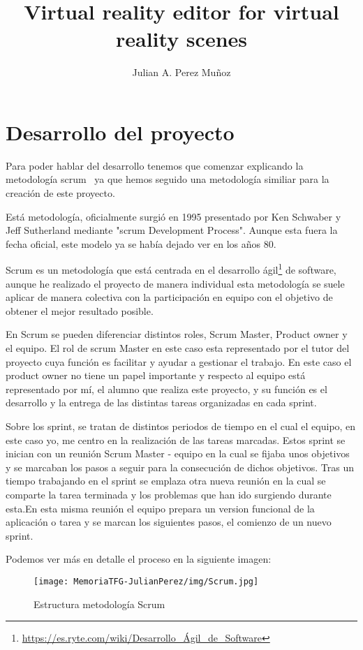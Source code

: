 \documentclass[a4paper, 12pt]{book}
\title{Virtual reality editor for virtual reality scenes}
\author{Julian A. Perez Muñoz}
\begin{document}
\cleardoublepage
\chapter{Desarrollo del proyecto}
\label{chap:Desarrollo del proyecto}
Para poder hablar del desarrollo tenemos que comenzar explicando la metodología scrum~\cite{proyectos} ya que hemos seguido una metodología similiar para la creación de este proyecto.

Está metodología, oficialmente surgió en 1995 presentado por Ken Schwaber y Jeff Sutherland mediante "scrum Development Process". Aunque esta fuera la fecha oficial, este modelo ya se había dejado ver en los años 80.

Scrum es un metodología que está centrada en el desarrollo ágil\footnote{\url{https://es.ryte.com/wiki/Desarrollo_Ágil_de_Software}}  de software, aunque he realizado el proyecto de manera individual esta metodología se suele aplicar de manera colectiva con la participación en equipo con el objetivo de obtener el mejor resultado posible.

En Scrum se pueden diferenciar distintos roles, Scrum Master, Product owner y el equipo. El rol de scrum Master en este caso esta representado por el tutor del proyecto cuya función es facilitar y ayudar a gestionar el trabajo. En este caso el product owner no tiene un papel importante y respecto al equipo está representado por mí, el alumno que realiza este proyecto, y su función es el desarrollo y la entrega de las distintas tareas organizadas en cada sprint.

Sobre los sprint, se tratan de distintos periodos de tiempo en el cual el equipo, en este caso yo, me centro en la realización de las tareas marcadas. Estos sprint se inician con un reunión Scrum Master - equipo en la cual se fijaba unos objetivos y se marcaban los pasos a seguir para la consecución de dichos objetivos. Tras un tiempo trabajando en el sprint se emplaza otra nueva reunión en la cual se comparte la tarea terminada y los problemas que han ido surgiendo durante esta.En esta misma reunión el equipo prepara un version funcional de la aplicación o tarea y se marcan los siguientes pasos, el comienzo de un nuevo sprint. 

Podemos ver más en detalle el proceso en la siguiente imagen:
\begin{figure}[H]
  \centering
  \texttt{[image: MemoriaTFG-JulianPerez/img/Scrum.jpg]}
  \caption{Estructura metodología Scrum}\label{scrum}
\end{figure}
\end{document}
